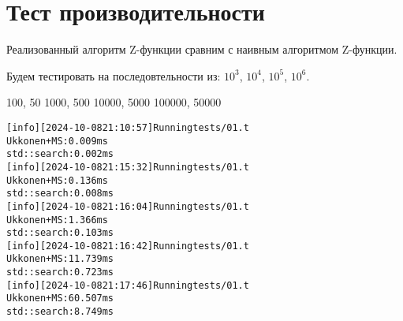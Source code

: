\section{Тест производительности}

Реализованный алгоритм Z-функции сравним с наивным алгоритмом Z-функции.

Будем тестировать на последовтельности из: $10^3$, $10^4$, $10^5$, $10^6$.

100, 50
1000, 500
10000, 5000
100000, 50000
\begin{alltt}
[info] [2024-10-08 21:10:57] Running tests/01.t
Ukkonen+MS: 0.009 ms
std::search: 0.002 ms
[info] [2024-10-08 21:15:32] Running tests/01.t
Ukkonen+MS: 0.136 ms
std::search: 0.008 ms
[info] [2024-10-08 21:16:04] Running tests/01.t
Ukkonen+MS: 1.366 ms
std::search: 0.103 ms
[info] [2024-10-08 21:16:42] Running tests/01.t
Ukkonen+MS: 11.739 ms
std::search: 0.723 ms
[info] [2024-10-08 21:17:46] Running tests/01.t
Ukkonen+MS: 60.507 ms
std::search: 8.749 ms
\end{alltt}


\pagebreak
